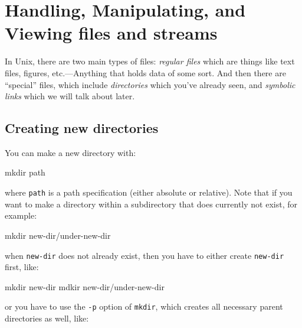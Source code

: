\documentclass[]{krantz}
\makeatletter
\newenvironment{Shaded}{\begin{snugshade}}{\end{snugshade}}
\newcommand{\ExtensionTok}[1]{#1}
\newcommand{\FunctionTok}[1]{\textcolor[rgb]{0,0,0}{#1}}
\newcommand{\NormalTok}[1]{#1}
\newenvironment{kframe}{%
\medskip{}
\setlength{\fboxsep}{.8em}
 \def\at@end@of@kframe{}%
 \ifinner\ifhmode%
  \def\at@end@of@kframe{\end{minipage}}%
  \begin{minipage}{\columnwidth}%
 \fi\fi%
 \def\FrameCommand##1{\hskip\@totalleftmargin \hskip-\fboxsep
 \colorbox{shadecolor}{##1}\hskip-\fboxsep
     \hskip-\linewidth \hskip-\@totalleftmargin \hskip\columnwidth}%
 \MakeFramed {\advance\hsize-\width
   \@totalleftmargin\z@ \linewidth\hsize
   \@setminipage}}%
 {\par\unskip\endMakeFramed%
 \at@end@of@kframe}
\renewenvironment{Shaded}{\begin{kframe}}{\end{kframe}}
\makeatother
\begin{document}
\hypertarget{handling-manipulating-and-viewing-files-and-streams}{%
\section{Handling, Manipulating, and Viewing files and streams}\label{handling-manipulating-and-viewing-files-and-streams}}

In Unix, there are two main types of files: \emph{regular files} which are things like text files,
figures, etc.---Anything that holds data of some sort. And then there are ``special'' files, which
include \emph{directories} which you've already seen, and \emph{symbolic links} which we will talk about later.

\hypertarget{creating-new-directories}{%
\subsection{Creating new directories}\label{creating-new-directories}}

You can make a new directory with:

\begin{Shaded}
\begin{Highlighting}[]
\FunctionTok{mkdir}\NormalTok{ path}
\end{Highlighting}
\end{Shaded}

where \texttt{path} is a path specification (either absolute or relative). Note that if you
want to make a directory within a subdirectory that does currently not exist, for example:

\begin{Shaded}
\begin{Highlighting}[]
\FunctionTok{mkdir}\NormalTok{ new-dir/under-new-dir}
\end{Highlighting}
\end{Shaded}

when \texttt{new-dir} does not already exist, then you have to either create \texttt{new-dir} first, like:

\begin{Shaded}
\begin{Highlighting}[]
\FunctionTok{mkdir}\NormalTok{ new-dir}
\ExtensionTok{mdkir}\NormalTok{ new-dir/under-new-dir}
\end{Highlighting}
\end{Shaded}

or you have to use the \texttt{-p} option of \texttt{mkdir}, which creates all necessary parent directories
as well, like:
\end{document}
